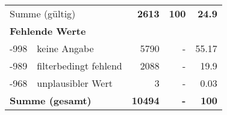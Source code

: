 \begin{longtable}{lXrrr}
     \midrule
     \multicolumn{2}{l}{Summe (gültig)} &
       \textbf{\num{2613}} &
     \textbf{100} &
       \textbf{\num[round-mode=places,round-precision=2]{24,9}} \\
     \multicolumn{5}{l}{\textbf{Fehlende Werte}}\\
       -998 &
       keine Angabe &
         \num{5790} &
        - &
         \num[round-mode=places,round-precision=2]{55,17} \\
       -989 &
       filterbedingt fehlend &
         \num{2088} &
        - &
         \num[round-mode=places,round-precision=2]{19,9} \\
       -968 &
       unplausibler Wert &
         \num{3} &
        - &
         \num[round-mode=places,round-precision=2]{0,03} \\
     \midrule
     \multicolumn{2}{l}{\textbf{Summe (gesamt)}} &
          \textbf{\num{10494}} &
        \textbf{-} &
        \textbf{100} \\
     \bottomrule
     \end{longtable}
     
